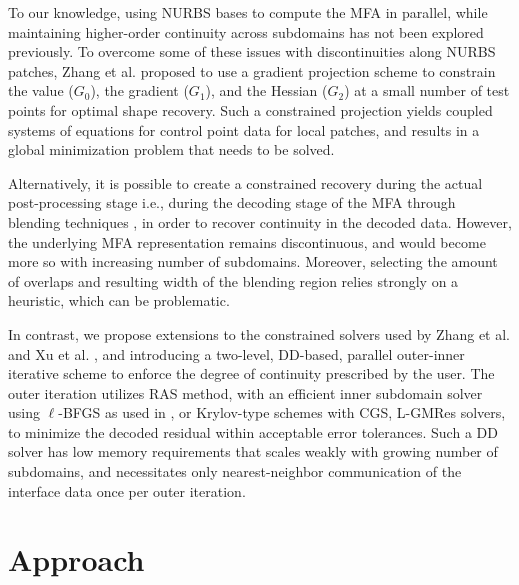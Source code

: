\documentclass[conference]{IEEEtran}
\begin{document}
To our knowledge, using NURBS bases to compute the MFA in parallel, while maintaining higher-order continuity across subdomains has not been explored previously. 
To overcome some of these issues with discontinuities along NURBS patches, Zhang et al. \cite{zhang-nurbs-continuity} proposed to use a gradient projection scheme to constrain the value ($G_0$), the gradient ($G_1$), and the Hessian ($G_2$) at a small number of test points for optimal shape recovery. Such a constrained projection yields coupled systems of equations for control point data for local patches, and results in a global minimization problem that needs to be solved.

Alternatively, it is possible to create a constrained recovery during the actual post-processing stage i.e., during the decoding stage of the MFA through blending techniques \cite{grindeanu-blending}, in order to recover continuity in the decoded data. However, the underlying MFA representation remains discontinuous, and would become more so with increasing number of subdomains. Moreover, selecting the amount of overlaps and resulting width of the blending region relies strongly on a heuristic, which can be problematic.

In contrast, we propose extensions to the constrained solvers used by Zhang et al. \cite{zhang-nurbs-continuity} and Xu et al. \cite{xu-jahn-discrete-adjoint}, and introducing a two-level, DD-based, parallel outer-inner iterative scheme to enforce the degree of continuity prescribed by the user. The outer iteration utilizes RAS \cite{gander-rasm} method, with an efficient inner subdomain solver using $\ell$-BFGS as used in \cite{zheng-bo-bspline-bfgs}, or Krylov-type schemes with CGS, L-GMRes solvers, to minimize the decoded residual within acceptable error tolerances. Such a DD solver has low memory requirements that scales weakly with growing number of subdomains, and necessitates only nearest-neighbor communication of the interface data once per outer iteration. 

\section{Approach}
\end{document}
